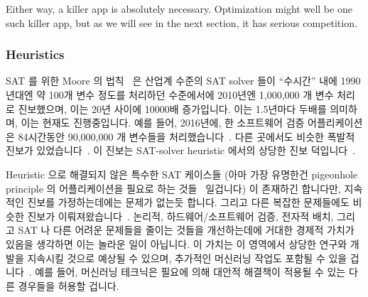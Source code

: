 Either way, a killer app is absolutely necessary.
Optimization might well be one such killer app, but as we will see in the
next section, it has serious competition.
\fi

\subsubsection{Heuristics}
\label{sec:future:Heuristics}

SAT 를 위한 Moore 의 법칙~\cite[Fig.~2.3]{Kroening:2008:DPA:1391237} 은 산업계
수준의 SAT solver 들이 ``수시간'' 내에 1990년대엔 약 100개 변수 정도를 처리하던
수준에서에 2010년엔 1,000,000 개 변수 처리로 진보했으며, 이는 20년 사이에
10000배 증가입니다.
이는 1.5년마다 두배를 의미하며, 이는 현재도 진행중입니다.
예를 들어, 2016년에, 한 소프트웨어 검증 어플리케이션은 84시간동안 90,000,000 개
변수들을 처리했습니다~\cite{LihaoLiang2016VerifyTreeRCU}.
다른 곳에서도 비슷한 폭발적 진보가
있었습니다~\cite{SharadMalik2010SATSolverHistory,SATCompetition2002,vanHarmelen:2007:HKR:1557461,Malik:2009:BST:1536616.1536637,JamesEzick2014ExtremeSAT}.
이 진보는 SAT-solver heuristic 에서의 상당한 진보
덕입니다~\cite{Kroening:2008:DPA:1391237,Zhang:2002:QEB:647771.734434,SharadMalik2010SATSolverHistory,Malik:2009:BST:1536616.1536637,Audemard:2009:PLC:1661445.1661509}.

Heuristic 으로 해결되지 않은 특수한 SAT 케이스들 (아마 가장 유명한건 pigeonhole
principle 의 어플리케이션을 필요로 하는
것들~\cite[page~38]{Kroening:2008:DPA:1391237} 일겁니다) 이 존재하긴 합니다만,
지속적인 진보를 가정하는데에는 문제가 없는듯 합니다.
그리고 다른 복잡한 문제들에도 비슷한 진보가
이뤄져왔습니다~\cite{WikipediaPrimalityTest,WikipediaTSP,WikipediaIntegerFactorization}.
논리적, 하드웨어/소프트웨어 검증, 전자적 배치, 그리고 SAT 나 다른 어려운
문제들을 줄이는 것들을 개선하는데에 거대한 경제적 가치가 있음을 생각하면 이는
놀라운 일이 아닙니다.
이 가치는 이 영역에서 상당한 연구와 개발을 지속시킬 것으로 예상될 수 있으며,
추가적인 머신러닝 작업도 포함될 수 있을
겁니다~\cite{ShaiHaim2009SAT-MachineLearning}.
예를 들어, 머신러닝 테크닉은 필요에 의해 대안적 해결책이 적용될 수 있는 다른
경우들을 허용할 겁니다.
\iffalse

